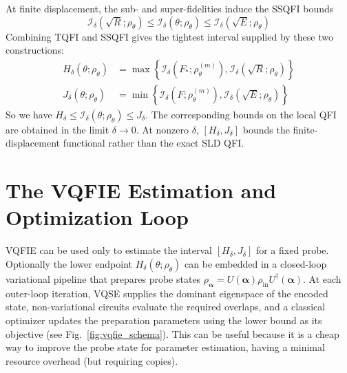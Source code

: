 \begin{definition}
    At finite displacement, the sub- and super-fidelities induce the SSQFI bounds
    \begin{equation}
        \mathcal{I}_\delta\left(\sqrt{R}; \rho_\theta\right) \le \mathcal{I}_\delta(\theta; \rho_\theta) \le \mathcal{I}_\delta\left(\sqrt{E}; \rho_\theta\right)
    \end{equation}
    Combining TQFI and SSQFI gives the tightest interval supplied by these two constructions:
    \begin{align}
        H_\delta(\theta; \rho_\theta) & = \max \left\{ \mathcal{I}_\delta\left(F_*; \rho_\theta^{(m)}\right), \mathcal{I}_\delta\left(\sqrt{R}; \rho_\theta\right) \right\}
        \label{eq:vqfie_combined_lower}                                                                                                                                     \\
        J_\delta(\theta; \rho_\theta) & = \min \left\{ \mathcal{I}_\delta\left(F; \rho_\theta^{(m)}\right), \mathcal{I}_\delta\left(\sqrt{E}; \rho_\theta\right) \right\}
        \label{eq:vqfie_combined_upper}
    \end{align}
    So we have $H_\delta\leq\mathcal{I}_\delta(\theta;\rho_\theta)\leq J_\delta$. The corresponding bounds on the local QFI are obtained in the limit $\delta\to0$. At nonzero $\delta$, $[H_\delta,J_\delta]$ bounds the finite-displacement functional rather than the exact SLD QFI.
\end{definition}




\section{The VQFIE Estimation and Optimization Loop}

VQFIE can be used only to estimate the interval $[H_\delta,J_\delta]$ for a fixed probe. Optionally the lower endpoint $H_\delta(\theta;\rho_\theta)$ can be embedded in a closed-loop variational pipeline that prepares probe states $\rho_{\boldsymbol{\alpha}}=U(\boldsymbol{\alpha})\rho_{\mathrm{in}}U^\dagger(\boldsymbol{\alpha})$. At each outer-loop iteration, VQSE supplies the dominant eigenspace of the encoded state, non-variational circuits evaluate the required overlaps, and a classical optimizer updates the preparation parameters using the lower bound as its objective (see Fig.~\ref{fig:vqfie_schema}). This can be useful because it is a cheap way to improve the probe state for parameter estimation, having a minimal resource overhead (but requiring copies).



